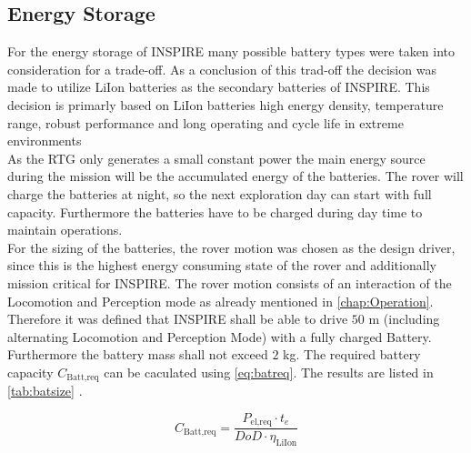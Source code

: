 \subsection{Energy Storage} 
For the energy storage of INSPIRE many possible battery types were taken into consideration for a trade-off. As a conclusion of this trad-off the decision was made to utilize LiIon batteries as the secondary batteries of INSPIRE. This decision is primarly based on LiIon batteries high energy density, temperature range, robust performance and long operating and cycle life in extreme environments\cite{IRSatUniversityofStuttgart.2020}\\
As the RTG only generates a small constant power the main energy source during the mission will be the accumulated energy of the batteries. The rover will charge the batteries at night, so the next exploration day can start with full capacity. Furthermore the batteries have to be charged during day time to maintain operations.\\
For the sizing of the batteries, the rover motion was chosen as the design driver, since this is the highest energy consuming state of the rover and additionally mission critical for INSPIRE. The rover motion consists of an interaction of the Locomotion and Perception mode as already mentioned in \autoref{chap:Operation}. Therefore it was defined that INSPIRE shall be able to drive $ 50$ m (including alternating Locomotion and Perception Mode) with a fully charged Battery. Furthermore the battery mass shall not exceed $2$ kg. The required battery capacity $C_\text{Batt,req}$ can be caculated using \autoref{eq:batreq}. The results are listed in \autoref{tab:batsize} \cite{S.Klinkner.2021}.


\begin{equation}
C_\text{Batt,req} = \frac{P_\text{el,req} \cdot t_e }{DoD \cdot \eta_\text{LiIon}}
\label{eq:batreq}
\end{equation}

